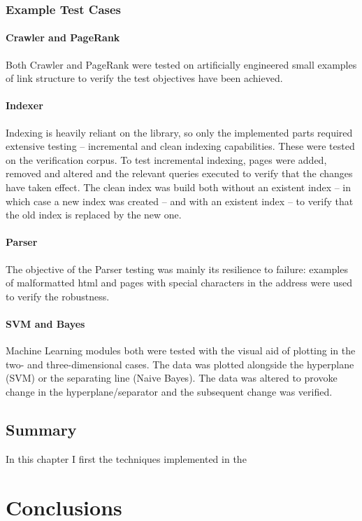 \documentclass[12pt,notitlepage,twoside]{scrreprt}
\begin{document}
\subsection{Example Test Cases}
\subsubsection{Crawler and PageRank} Both Crawler and PageRank were tested on artificially
engineered small examples of link structure to verify the test objectives have been
achieved.  \subsubsection{Indexer} Indexing is heavily reliant on the library, so only the
implemented parts required extensive testing -- incremental and clean indexing
capabilities. These were tested on the verification corpus.  To test incremental indexing,
pages were added, removed and altered and the relevant queries executed to verify that the
changes have taken effect. The clean index was build both without an existent index -- in
which case a new index was created -- and with an existent index -- to verify that the old
index is replaced by the new one.  \subsubsection{Parser} The objective of the Parser
testing was mainly its resilience to failure: examples of malformatted html and pages with
special characters in the address were used to verify the robustness. \subsubsection{SVM
and Bayes} Machine Learning modules both were tested with the visual aid of plotting in
the two- and three-dimensional cases. The data was plotted alongside the hyperplane (SVM)
or the separating line (Naive Bayes). The data was altered to provoke change in the
hyperplane/separator and the subsequent change was verified.
\section{Summary}
In this chapter I first the techniques implemented in the

\cleardoublepage
\chapter{Conclusions}
\end{document}
